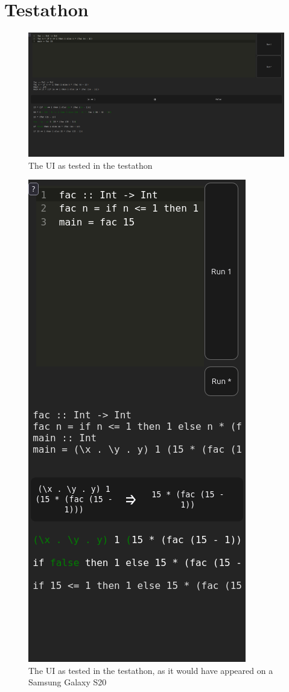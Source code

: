 \section{Testathon}

\begin{figure}[h]
    \centering
    \includegraphics[width=1\linewidth]{images/product_at_testathon.png}
    \caption{The UI as tested in the testathon}
    \label{fig:screenshot_testathon}
\end{figure}

\begin{figure}
    \centering
    \includegraphics[width=0.5\linewidth]{images/testathon-mobile.png}
    \caption{The UI as tested in the testathon, as it would have appeared on a Samsung Galaxy S20}
    \label{fig:screenshot_testathon_mobile}
\end{figure}

